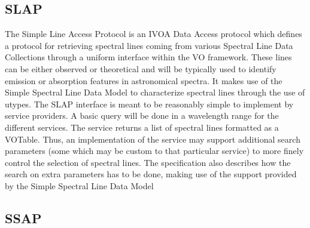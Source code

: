 \documentclass[11pt,a4paper]{ivoa}
\begin{document}
\subsection{SLAP}

The Simple Line Access Protocol is an IVOA Data Access protocol which defines a protocol 
for retrieving spectral lines coming from various Spectral Line Data Collections through a 
uniform interface within the VO framework. These lines can be either observed or theoretical 
and will be typically used to identify emission or absorption features in astronomical 
spectra. It makes use of the Simple Spectral Line Data Model to characterize spectral lines 
through the use of utypes. The SLAP interface is meant to be reasonably simple to implement 
by service providers. A basic query will be done in a wavelength range for the different 
services. The service returns a list of spectral lines formatted as a VOTable. Thus, an 
implementation of the service may support additional search parameters (some which may be 
custom to that particular service) to more finely control the selection of spectral lines.
The specification also describes how the search on extra parameters has to be done, making 
use of the support provided by the Simple Spectral Line Data Model

\subsection{SSAP}
\end{document}
